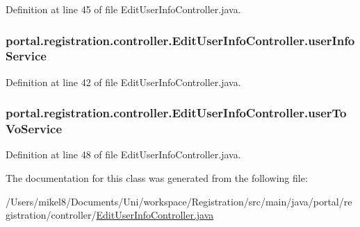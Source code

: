 Definition at line 45 of file EditUserInfoController.java.

\hypertarget{classportal_1_1registration_1_1controller_1_1EditUserInfoController_a92a1c1746c66dbf600394d8b042acc65}{
\subsubsection[{userInfoService}]{ {\bf portal.registration.controller.EditUserInfoController.userInfoService}}}
\label{classportal_1_1registration_1_1controller_1_1EditUserInfoController_a92a1c1746c66dbf600394d8b042acc65}


Definition at line 42 of file EditUserInfoController.java.

\hypertarget{classportal_1_1registration_1_1controller_1_1EditUserInfoController_a5b22c5c2153cf26ed9ce7c515b29af04}{
\subsubsection[{userToVoService}]{ {\bf portal.registration.controller.EditUserInfoController.userToVoService}}}
\label{classportal_1_1registration_1_1controller_1_1EditUserInfoController_a5b22c5c2153cf26ed9ce7c515b29af04}


Definition at line 48 of file EditUserInfoController.java.



The documentation for this class was generated from the following file:\begin{DoxyCompactItemize}
\item 
/Users/mikel8/Documents/Uni/workspace/Registration/src/main/java/portal/registration/controller/\hyperlink{EditUserInfoController_8java}{EditUserInfoController.java}\end{DoxyCompactItemize}
